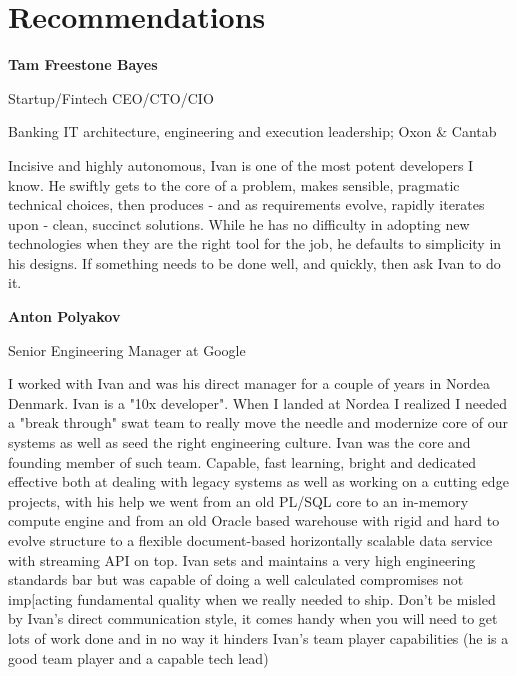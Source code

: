 \documentclass[letterpaper,11pt]{article}
\begin{document}
\section{Recommendations}



\renewcommand{\mkbegdispquote}[2]{\itshape}

\textbf{Tam Freestone Bayes}

Startup/Fintech CEO/CTO/CIO

Banking IT architecture, engineering and execution leadership; Oxon & Cantab

\begin{displayquote}
Incisive and highly autonomous, Ivan is one of the most potent developers I know.
He swiftly gets to the core of a problem, makes sensible, pragmatic technical choices, then produces - and as requirements evolve, rapidly iterates upon - clean, succinct solutions. While he has no difficulty in adopting new technologies when they are the right tool for the job, he defaults to simplicity in his designs. If something needs to be done well, and quickly, then ask Ivan to do it.
\end{displayquote}

\textbf{Anton Polyakov}

Senior Engineering Manager at Google

\begin{displayquote}
I worked with Ivan and was his direct manager for a couple of years in Nordea Denmark. Ivan is a "10x developer". When I landed at Nordea I realized I needed a "break through" swat team to really move the needle and modernize core of our systems as well as seed the right engineering culture. Ivan was the core and founding member of such team. Capable, fast learning, bright and dedicated effective both at dealing with legacy systems as well as working on a cutting edge projects, with his help we went from an old PL/SQL core to an in-memory compute engine and from an old Oracle based warehouse with rigid and hard to evolve structure to a flexible document-based horizontally scalable data service with streaming API on top. Ivan sets and maintains a very high engineering standards bar but was capable of doing a well calculated compromises not imp[acting fundamental quality when we really needed to ship.
Don't be misled by Ivan's direct communication style, it comes handy when you will need to get lots of work done and in no way it hinders Ivan's team player capabilities (he is a good team player and a capable tech lead)
\end{displayquote}
\end{document}
